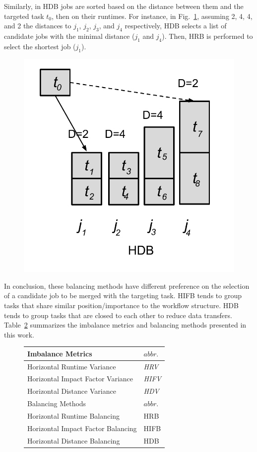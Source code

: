 \documentclass[final,5p,times,twocolumn]{elsarticle}
\begin{document}
Similarly, in HDB jobs are sorted based on the distance between them and the targeted task $t_0$, then on their runtimes. For instance, in Fig.~\ref{fig:algorithm_hdb}, assuming 2, 4, 4, and 2 the distances to $j_1$, $j_2$, $j_3$, and $j_4$ respectively, HDB selects a list of candidate jobs with the minimal distance ($j_1$ and $j_4$). Then, HRB is performed to select the shortest job ($j_1$). 

\begin{figure}[htb]
	\centering
	\includegraphics[width=0.5\linewidth]{figure/algorithm_hdb.pdf}
	\label{fig:algorithm_hdb}
	\vspace{-15pt}
\end{figure}

In conclusion, these balancing methods have different preference on the selection of a candidate job to be merged with the targeting task. HIFB tends to group tasks that share similar position/importance to the workflow structure. HDB tends to group tasks that are closed to each other to reduce data transfers. Table~\ref{tab:2} summarizes the imbalance metrics and balancing methods presented in this work. 

\begin{figure}[htb]
	\centering
	\begin{tabular}{l|l}
		\hline
		Imbalance Metrics & $abbr.$   \\
		\hline
		Horizontal Runtime Variance & \emph{HRV}   \\ 
		Horizontal Impact Factor Variance & \emph{HIFV} \\ 
		Horizontal Distance Variance & \emph{HDV}  \\ 
		\hline
		Balancing Methods & $abbr.$  \\
		\hline
		Horizontal Runtime Balancing & HRB   \\ 
		Horizontal Impact Factor Balancing & HIFB\\ 
		Horizontal Distance Balancing & HDB \\ 
		\hline
	\end{tabular}
	\label{tab:2}
	\vspace{-10pt}
\end{figure}
\end{document}
